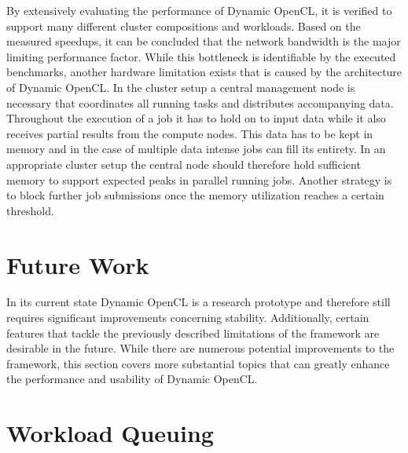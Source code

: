 By extensively evaluating the performance of Dynamic OpenCL, it is verified to support many different cluster compositions and workloads. Based on the measured speedups, it can be concluded that the network bandwidth is the major limiting performance factor. While this bottleneck is identifiable by the executed benchmarks, another hardware limitation exists that is caused by the architecture of Dynamic OpenCL. In the cluster setup a central management node is necessary that coordinates all running tasks and distributes accompanying data. Throughout the execution of a job it has to hold on to input data while it also receives partial results from the compute nodes. This data has to be kept in memory and in the case of multiple data intense jobs can fill its entirety. In an appropriate cluster setup the central node should therefore hold sufficient memory to support expected peaks in parallel running jobs. Another strategy is to block further job submissions once the memory utilization reaches a certain threshold.

\section{Future Work}

In its current state Dynamic OpenCL is a research prototype and therefore still requires significant improvements concerning stability. Additionally, certain features that tackle the previously described limitations of the framework are desirable in the future. While there are numerous potential improvements to the framework, this section covers more substantial topics that can greatly enhance the performance and usability of Dynamic OpenCL.

\section*{Workload Queuing}

